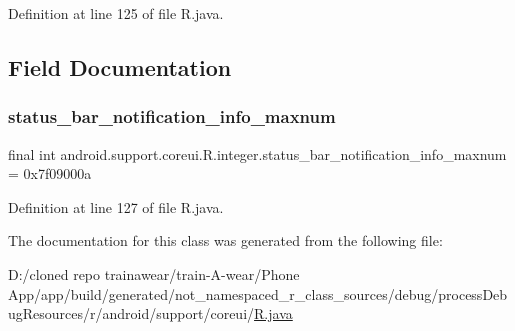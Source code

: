 Definition at line 125 of file R.\+java.


\begin{DoxyCode}{0}

\end{DoxyCode}


\subsection{Field Documentation}
\mbox{\label{classandroid_1_1support_1_1coreui_1_1_r_1_1integer_ae25c73a19ff7780a6f36e92aa4d65ea4}} 
\subsubsection{\texorpdfstring{status\_bar\_notification\_info\_maxnum}{status\_bar\_notification\_info\_maxnum}}
{\footnotesize\ttfamily final int android.\+support.\+coreui.\+R.\+integer.\+status\+\_\+bar\+\_\+notification\+\_\+info\+\_\+maxnum = 0x7f09000a\hspace{0.3cm}{\ttfamily [static]}}



Definition at line 127 of file R.\+java.



The documentation for this class was generated from the following file\+:\begin{DoxyCompactItemize}
\item 
D\+:/cloned repo trainawear/train-\/\+A-\/wear/\+Phone App/app/build/generated/not\+\_\+namespaced\+\_\+r\+\_\+class\+\_\+sources/debug/process\+Debug\+Resources/r/android/support/coreui/\mbox{\hyperlink{process_debug_resources_2r_2android_2support_2coreui_2_r_8java}{R.\+java}}\end{DoxyCompactItemize}

